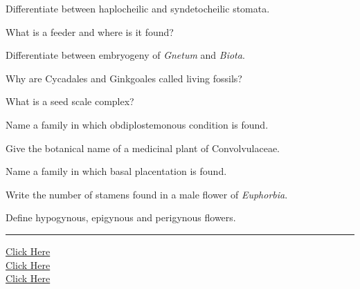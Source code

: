 \documentclass[11pt,a4paper]{article}
\begin{document}
\begin{parts}
  \item Differentiate between haplocheilic and syndetocheilic stomata.
  \item What is a feeder and where is it found?
  \item Differentiate between embryogeny of   \textit{Gnetum} and   \textit{Biota}.
  \item Why are Cycadales and Ginkgoales called living fossils?
  \item What is a seed scale complex?
  \item Name a family in which obdiplostemonous condition is found.
  \item Give the botanical name of a medicinal plant of Convolvulaceae.
  \item Name a family in which basal placentation is found.
  \item Write the number of stamens found in a male flower of   \textit{Euphorbia}.
  \item Define hypogynous, epigynous and perigynous flowers.
\end{parts}

\vfill
\rule{\linewidth}{0.4pt}

\begin{center}\small
\href{https://bhu-exam.vercel.app/}{Click Here}\\[4pt]\href{https://me-aryan.vercel.app/}{Click Here}\\[4pt]\href{https://quashan-me.vercel.app/}{Click Here}
\end{center}
\end{document}

